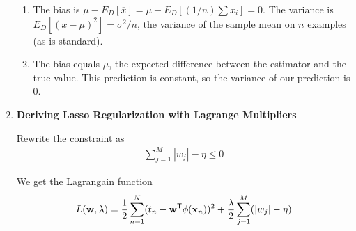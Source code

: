 \documentclass[12pt,letterpaper]{article}
\begin{document}
\begin{enumerate}
\vspace{\baselineskip}


\begin{enumerate}
\item The bias is $\mu - E_D[\overline{x}] = \mu - E_D[(1/n)\sum x_i]=0$. The variance is $E_D[(\overline{x} - \mu)^2] = \sigma^2 / n$, the variance of the sample mean on $n$ examples (as is standard).

\item The bias equals $\mu$, the expected difference between the estimator and the true value. This prediction is constant, so the variance of our prediction is $0$.
\end{enumerate}

\newpage

\item {\bf Deriving Lasso Regularization with Lagrange Multipliers }\\

\vspace{\baselineskip}


Rewrite the constraint as 
\begin{align*}
\sum_{j = 1}^M |w_j| - \eta \leq 0
\end{align*}

We get the Lagrangain function 
\begin{align*}
L(\mathbf{w}, \lambda) = \frac{1}{2} \sum_{n = 1}^N (t_n - \mathbf{w}^{\mathsf{T}} \phi(\mathbf{x}_n) )^2 + \frac{\lambda}{2} \sum_{j = 1}^M (|w_j| - \eta)
\end{align*}


\end{enumerate}
\end{document}
